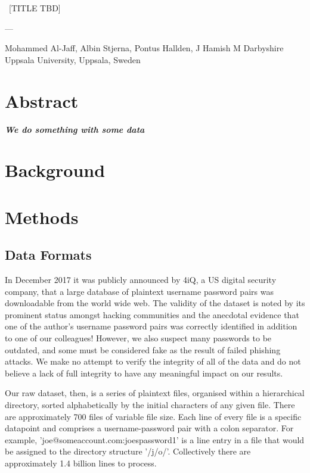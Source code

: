 \documentclass{article}
\begin{document}
{
	\centering
	\vspace{1cm}
	{\scshape\Huge\ [TITLE TBD] \par}
	\vspace{1cm}
	{\scshape\Large --- \par}
	\vspace{0.9cm}
	\begin{center}{Mohammed Al-Jaff, Albin Stjerna, Pontus Hallden, J Hamish M Darbyshire}\\
	Uppsala University, Uppsala, Sweden
	\end{center}
}

\begin{multicols}{2}

\section*{Abstract}

\textbf{ \textit { We do something with some data }}

\section*{Background}

\section*{Methods}
\subsection*{Data Formats}
In December 2017 it was publicly announced by 4iQ, a US digital security company, \cite{data2017breach} that a large database of plaintext username password pairs was downloadable from the world wide web. The validity of the dataset is noted by its prominent status amongst hacking communities and the anecdotal evidence that one of the author's username password pairs was correctly identified in addition to one of our colleagues! However, we also suspect many passwords to be outdated, and some must be considered fake as the result of failed phishing attacks. We make no attempt to verify the integrity of all of the data and do not believe a lack of full integrity to have any meaningful impact on our results.
\par Our raw dataset, then, is a series of plaintext files, organised within a hierarchical directory, sorted alphabetically by the initial characters of any given file. There are approximately 700 files of variable file size. Each line of every file is a specific datapoint and comprises a username-password pair with a colon separator. For example, 'joe@someaccount.com:joespassword1' is a line entry in a file that would be assigned to the directory structure '/j/o/'. Collectively there are approximately 1.4 billion lines to process.
\par [\_\_INPUT\_\_ on what drive do we store the data and why choose that?]


\end{multicols}
\end{document}
